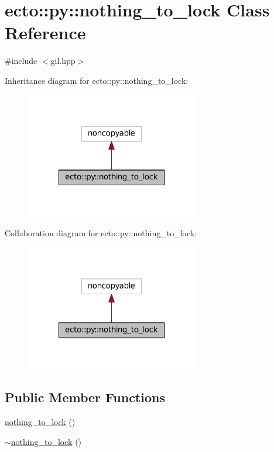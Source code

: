 \hypertarget{classecto_1_1py_1_1nothing__to__lock}{\section{ecto\-:\-:py\-:\-:nothing\-\_\-to\-\_\-lock Class Reference}
\label{classecto_1_1py_1_1nothing__to__lock}
}


{\ttfamily \#include $<$gil.\-hpp$>$}



Inheritance diagram for ecto\-:\-:py\-:\-:nothing\-\_\-to\-\_\-lock\-:\nopagebreak
\begin{figure}[H]
\begin{center}
\leavevmode
\includegraphics[width=214pt]{classecto_1_1py_1_1nothing__to__lock__inherit__graph}
\end{center}
\end{figure}


Collaboration diagram for ecto\-:\-:py\-:\-:nothing\-\_\-to\-\_\-lock\-:\nopagebreak
\begin{figure}[H]
\begin{center}
\leavevmode
\includegraphics[width=214pt]{classecto_1_1py_1_1nothing__to__lock__coll__graph}
\end{center}
\end{figure}
\subsection*{Public Member Functions}
\begin{DoxyCompactItemize}
\item 
\hyperlink{classecto_1_1py_1_1nothing__to__lock_a277b110e856f61f30f645e4bed50c566}{nothing\-\_\-to\-\_\-lock} ()
\item 
\hyperlink{classecto_1_1py_1_1nothing__to__lock_aa734fa290aeb9aa7de729960aa12df9b}{$\sim$nothing\-\_\-to\-\_\-lock} ()
\end{DoxyCompactItemize}


